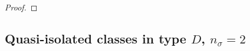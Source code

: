 \documentclass{amsart}
\numberwithin{equation}{section}
\theoremstyle{definition}
\theoremstyle{remark}
\newcommand\bG{{\mathbf G}}
\newcommand\bT{{\mathbf T}}
\newcommand\CO{{\mathcal O}}
\newcommand\Ts{{\bT^\sigma}}
\newcommand\inv{^{-1}}
\newcommand\GL{\mathrm{GL}}
\newcommand\SL{\mathrm{SL}}
\newcommand\PGL{\mathrm{PGL}}
\newcommand\SO{\mathrm{SO}}
\newcommand\Sp{\mathrm{Sp}}
\newcommand\diag{\mathrm{diag}}
\newcommand\card[1]{{|#1|}}
\begin{document}
\begin{proof}
%
%
%
\end{proof}
\subsection*{Quasi-isolated classes in type $D$, $n_\sigma=2$}
\end{document}
